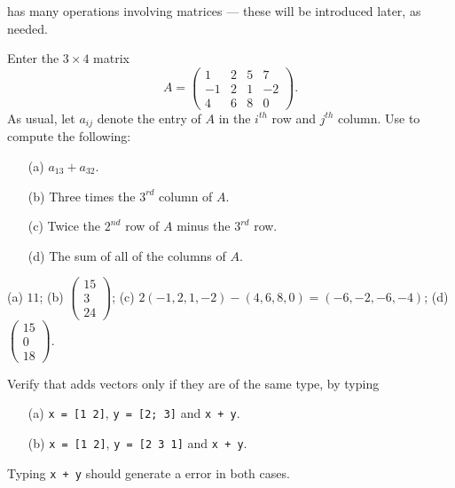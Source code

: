 \documentclass{ximera}
\begin{document}
\Matlab has many operations involving matrices --- these will
be introduced later, as needed.

\EXER

\CEXER

\begin{exercise}  \label{c1.2.1}
Enter the $3\times 4$ matrix
\[
A = \left(\begin{array}{rrrr} 1 & 2 & 5 & 7 \\ -1 & 2 & 1 & -2
\\ 4 & 6 & 8 & 0 \end{array}\right).
\]
As usual, let $a_{ij}$ denote the entry of $A$ in the $i^{th}$
row and $j^{th}$ column.  Use \Matlab to compute the following:
\begin{enumerate}
\item[(a)] $a_{13} + a_{32}$.
\item[(b)] Three times the $3^{rd}$ column of $A$.
\item[(c)] Twice the $2^{nd}$ row of $A$ minus the $3^{rd}$ row.
\item[(d)] The sum of all of the columns of $A$.
\end{enumerate}

\begin{solution}

(a) $11$;
(b) $\left(\begin{array}{r} 15\\ 3 \\24\end{array} \right)$;
(c) $2(-1,2, 1,-2)- (4, 6, 8, 0)=(-6,-2,-6,-4)$;
(d) $\left(\begin{array}{r} 15 \\ 0 \\ 18 \end{array} \right)$.

\end{solution}
\end{exercise}

\begin{exercise}  \label{c1.2.2}
Verify that \Matlab adds vectors only if they are of the same type, by typing
\begin{enumerate}
\item[(a)]  {\tt x = [1 2]}, {\tt y = [2; 3]} and {\tt x + y}.
\item[(b)]  {\tt x = [1 2]}, {\tt y = [2 3 1]} and {\tt x + y}.
\end{enumerate}

\begin{solution}

Typing {\tt x + y} should generate a \Matlab error in both cases.

\end{solution}
\end{exercise}
\end{document}
